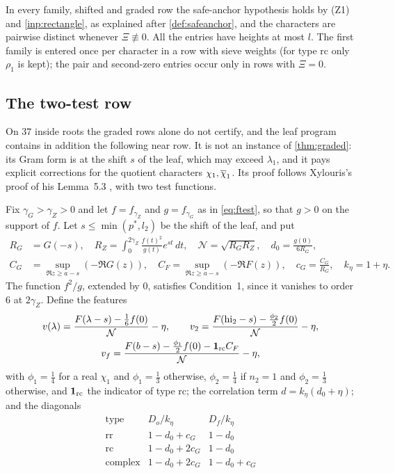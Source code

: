 In every family, shifted and graded row the safe-anchor hypothesis holds by (Z1) and
\cref{inp:rectangle}, as explained after \cref{def:safeanchor}, and the characters are pairwise distinct
whenever $\Xi\not\equiv0$. All the
entries have heights at most $l$. The first family is entered once per character in a row with
sieve weights (for type $\mathrm{rc}$ only $\rho_1$ is kept); the pair and second-zero entries occur only
in rows with $\Xi=0$.

\subsection{The two-test row}\label{subsec:twotest}
On $37$ inside roots the graded rows alone do not certify, and the leaf program contains in
addition the following near row. It is not an instance of \cref{thm:graded}: its Gram form is at
the shift $s$ of the leaf, which may exceed $\lambda_1$, and it pays explicit corrections for the
quotient characters $\chi_1,\overline{\chi}_1$. Its proof follows Xylouris's proof of his Lemma~5.3
\cite[(5.34)--(5.40), pp.~72--76]{Xylouris2011nullstellen}, with two test functions.

Fix $\gamma_G>\gamma_Z>0$ and let $f=f_{\gamma_Z}$ and $g=f_{\gamma_G}$ as in \eqref{eq:ftest}, so that $g>0$ on the
support of $f$. Let $s\le\min(p^*,l_2)$ be the shift of the leaf, and put
\begin{align*}
  R_G&=G(-s),\quad R_Z=\int_0^{2\gamma_Z}\frac{f(t)^2}{g(t)}e^{st}\,dt,\quad \mathcal N=\sqrt{R_GR_Z},\quad
  d_0=\frac{g(0)}{6R_G},\\
  C_G&=\sup_{\Re z\ge a-s}(-\Re G(z)),\quad C_F=\sup_{\Re z\ge a-s}(-\Re F(z)),\quad c_G=\frac{C_G}{R_G},\quad k_\eta=1+\eta .
\end{align*}
The function $f^2/g$, extended by $0$, satisfies Condition~1, since it vanishes to order $6$ at
$2\gamma_Z$. Define the features
\begin{gather*}
  v(\lambda)=\frac{F(\lambda-s)-\frac16f(0)}{\mathcal N}-\eta,\qquad
  v_2=\frac{F(\mathrm{hi}_2-s)-\frac{\phi_2}2f(0)}{\mathcal N}-\eta,\\
  v_f=\frac{F(b-s)-\frac{\phi_1}2f(0)-\mathbf{1}_{\mathrm{rc}}C_F}{\mathcal N}-\eta,
\end{gather*}
with $\phi_1=\frac14$ for a real $\chi_1$ and $\phi_1=\frac13$ otherwise, $\phi_2=\frac14$ if $n_2=1$ and
$\phi_2=\frac13$ otherwise, and $\mathbf{1}_{\mathrm{rc}}$ the indicator of type $\mathrm{rc}$; the correlation term $d=k_\eta(d_0+\eta)$; and the diagonals
\[
  \begin{array}{lll}
    \text{type} & D_o/k_\eta & D_f/k_\eta\\
    \mathrm{rr} & 1-d_0+c_G & 1-d_0\\
    \mathrm{rc} & 1-d_0+2c_G & 1-d_0\\
    \mathrm{complex} & 1-d_0+2c_G & 1-d_0+c_G
  \end{array}
\]

